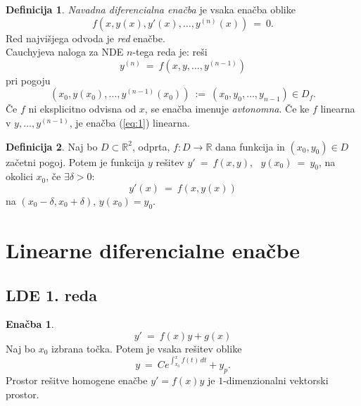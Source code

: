 \documentclass[11pt]{article}
\newcommand{\R}{\mathbb{R}}
\theoremstyle{definition}
\newtheorem{definicija}{Definicija}[section]
\theoremstyle{definition}
\theoremstyle{definition}
\theoremstyle{definition}
\newtheorem{enacba}{Enačba}
\begin{document}
\begin{definicija}

\textit{Navadna diferencialna enačba} je vsaka enačba oblike
$$f(x,y(x),y'(x),\ldots,y^{(n)}(x)) ~=~ 0.$$
Red najvišjega odvoda je \textit{red} enačbe. \\

\noindent Cauchyjeva naloga za NDE $n$-tega reda je: reši
\begin{equation} \label{eq:1}
y^{(n)} ~=~ f(x,y,\ldots,y^{(n-1)})
\end{equation}
pri pogoju
$$(x_0,y(x_0),\ldots,y^{(n-1)}(x_0)) ~:=~ (x_0,y_0,\ldots,y_{n-1}) \in D_f.$$
Če $f$ ni eksplicitno odvisna od $x$, se enačba imenuje \textit{avtonomna}. Če ke $f$ linearna v $y,\ldots,y^{(n-1)}$, je enačba (\ref{eq:1}) linearna.

\end{definicija}
\vspace{0.5cm}

\begin{definicija}

Naj bo $D \subset \R^2$, odprta, $f: D \rightarrow \R$ dana funkcija in $(x_0,y_0) \in D$ začetni pogoj. Potem je funkcija $y$ rešitev
$y' ~=~ f(x,y), ~~~y(x_0) ~=~ y_0$,
na okolici $x_0$, če $\exists \delta > 0$:
$$y'(x) ~=~ f(x,y(x))$$
na $(x_0 - \delta, x_0 + \delta)$, $y(x_0) = y_0$.

\end{definicija}
\vspace{0.5cm}

\pagebreak


\section{Linearne diferencialne enačbe}
\vspace{0.5cm}


\subsection{LDE 1. reda}
\vspace{0.5cm}

\begin{enacba}

$$y' ~=~ f(x)y + g(x)$$
Naj bo $x_0$ izbrana točka. Potem je vsaka rešitev oblike
$$y ~=~ Ce^{\int_{x_0}^x f(t) \,dt} + y_p.$$
Prostor rešitve homogene enačbe $y' = f(x)y$ je $1$-dimenzionalni vektorski prostor.

\end{enacba}
\vspace{0.5cm}
\end{document}
